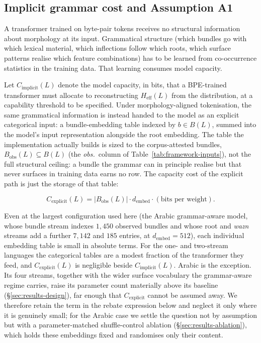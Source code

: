 \subsection{Implicit grammar cost and Assumption A1}
\label{sec:framework-A1}

A transformer trained on byte-pair tokens receives no structural information about morphology at its input. Grammatical structure (which bundles go with which lexical material, which inflections follow which roots, which surface patterns realise which feature combinations) has to be learned from co-occurrence statistics in the training data. That learning consumes model capacity.

Let $C_{\mathrm{implicit}}(L)$ denote the model capacity, in bits, that a BPE-trained transformer must allocate to reconstructing $H_{\mathrm{eff}}(L)$ from the distribution, at a capability threshold to be specified. Under morphology-aligned tokenisation, the same grammatical information is instead handed to the model as an explicit categorical input: a bundle-embedding table indexed by $b \in B(L)$, summed into the model's input representation alongside the root embedding. The table the implementation actually builds is sized to the corpus-attested bundles, $B_{\mathrm{obs}}(L) \subseteq B(L)$ (the \emph{obs.}\ column of Table~\ref{tab:framework-inputs}), not the full structural ceiling: a bundle the grammar can in principle realise but that never surfaces in training data earns no row. The capacity cost of the explicit path is just the storage of that table:

\begin{equation}
C_{\mathrm{explicit}}(L) = |B_{\mathrm{obs}}(L)| \cdot d_{\mathrm{embed}} \cdot (\text{bits per weight}).
\label{eq:Cexplicit}
\end{equation}

Even at the largest configuration used here (the Arabic grammar-aware model, whose bundle stream indexes $1{,}450$ observed bundles and whose root and \emph{wazn} streams add a further $7{,}142$ and $185$ entries, at $d_{\mathrm{embed}} = 512$), each individual embedding table is small in absolute terms. For the one- and two-stream languages the categorical tables are a modest fraction of the transformer they feed, and $C_{\mathrm{explicit}}(L)$ is negligible beside $C_{\mathrm{implicit}}(L)$. Arabic is the exception. Its four streams, together with the wider surface vocabulary the grammar-aware regime carries, raise its parameter count materially above its baseline (\S\ref{sec:results-design}), far enough that $C_{\mathrm{explicit}}$ cannot be assumed away. We therefore retain the term in the rebate expression below and neglect it only where it is genuinely small; for the Arabic case we settle the question not by assumption but with a parameter-matched shuffle-control ablation (\S\ref{sec:results-ablation}), which holds these embeddings fixed and randomises only their content.

